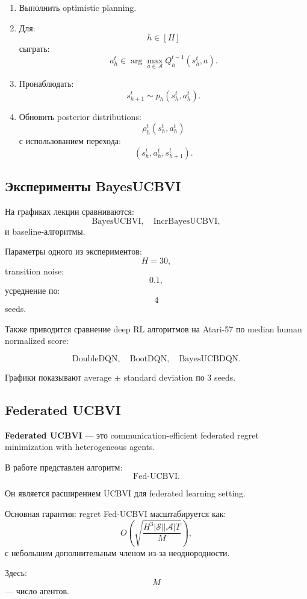 \documentclass[12pt,a4paper]{article}
\begin{document}
\begin{enumerate}
    \item Выполнить optimistic planning.

    \item Для:
    \[
    h\in[H]
    \]
    сыграть:
    \[
    a_h^t
    \in
    \arg\max_{a\in\mathcal A}
    Q_h^{t-1}(s_h^t,a).
    \]

    \item Пронаблюдать:
    \[
    s_{h+1}^t
    \sim
    p_h(s_h^t,a_h^t).
    \]

    \item Обновить posterior distributions:
    \[
    \rho_h^t(s_h^t,a_h^t)
    \]
    с использованием перехода:
    \[
    (s_h^t,a_h^t,s_{h+1}^t).
    \]
\end{enumerate}

\subsection{Эксперименты BayesUCBVI}

На графиках лекции сравниваются:
\[
\text{BayesUCBVI},
\quad
\text{IncrBayesUCBVI},
\]
и baseline-алгоритмы.

Параметры одного из экспериментов:
\[
H=30,
\]
transition noise:
\[
0.1,
\]
усреднение по:
\[
4
\]
seeds.

Также приводится сравнение deep RL алгоритмов на Atari-57 по median human normalized score:

\[
\text{DoubleDQN},
\quad
\text{BootDQN},
\quad
\text{BayesUCBDQN}.
\]

Графики показывают average $\pm$ standard deviation по 3 seeds.

\subsection{Federated UCBVI}

\textbf{Federated UCBVI} --- это communication-efficient federated regret minimization with heterogeneous agents.

В работе представлен алгоритм:
\[
\text{Fed-UCBVI}.
\]

Он является расширением UCBVI для federated learning setting.

Основная гарантия: regret Fed-UCBVI масштабируется как:
\[
O
\left(
\sqrt{
\frac{H^3|\mathcal S||\mathcal A|T}{M}
}
\right),
\]
с небольшим дополнительным членом из-за неоднородности.

Здесь:
\[
M
\]
--- число агентов.
\end{document}
